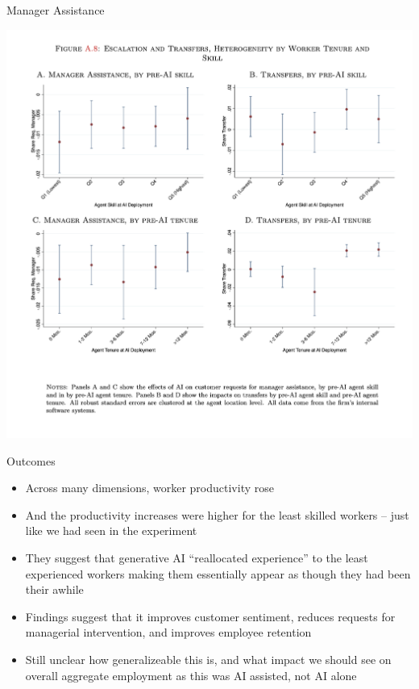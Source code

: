 \documentclass{beamer}
\begin{document}
\begin{frame}{Manager Assistance}
\begin{center}
\includegraphics[scale=0.25]{./lecture_includes/brynn9}
\end{center}
\end{frame}


\begin{frame}{Outcomes}

\begin{itemize}

\item Across many dimensions, worker productivity rose
\item And the productivity increases were higher for the least skilled workers -- just like we had seen in the experiment
\item They suggest that generative AI ``reallocated experience'' to the least experienced workers making them essentially appear as though they had been their awhile
\item Findings suggest that it improves customer sentiment, reduces requests for managerial intervention, and improves employee retention
\item Still unclear how generalizeable this is, and what impact we should see on overall aggregate employment as this was AI assisted, not AI alone

\end{itemize}

\end{frame}
\end{document}
